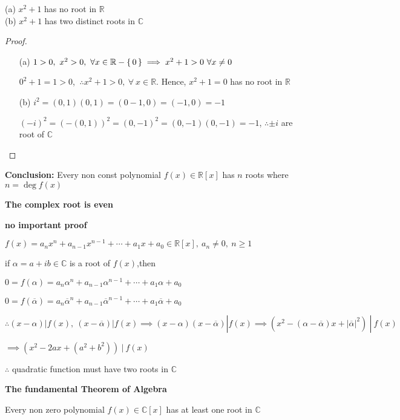 \begin{thm*}  $ $\\
		(a) $x^2 + 1$ has no root in $\mathbb R$\\
		(b) $x^2 + 1$ has two distinct roots in $\mathbb C$
\end{thm*}

\begin{proof}$ $
	\begin{enumerate}
		\item[(a)] $1>0,~x^2>0,~\forall x \in \mathbb R - \left\{ \,0 \,\right\} \implies x^2 + 1 > 0 ~\forall x \neq 0$ 
		
		$0^2 + 1 = 1 > 0$, $~\therefore x^2 + 1 > 0 ,~\forall~ x \in \mathbb R$. Hence, $x^2 + 1 = 0$ has no root in $\mathbb R$
		\item[(b)] $i^2 = (0,1)(0,1) = (0-1,0) = (-1,0) = -1$
		
		$(-i)^2 = (-(0,1))^2 = (0,-1)^2 = (0,-1)(0,-1) = -1$, $\therefore \pm i$ are root of $\mathbb C$
	\end{enumerate}
\end{proof}

\textbf{Conclusion:} Every non const polynomial $f(x) \in \mathbb R[x]$ has $n$ roots where $n = \deg f(x)$


\textbf{The complex root is even}
\begin{tcolorbox}
	\textbf{\color{blue} no important proof} 
	
	$f(x) = a_nx^n + a_{n-1}x^{n-1}+\cdots+a_1x+a_0 \in \mathbb R[x],~a_n \neq 0,~n\geq 1$
	
	if $\alpha = a+ib \in \mathbb C$ is a root of $f(x)$,then
	
	$0 = f(\alpha) = a_n\alpha^n + a_{n-1}\alpha^{n-1}+\cdots + a_1\alpha + a_0$
	
	$0 = f(\overline{\alpha}) = a_n\overline{\alpha}^n + a_{n-1}\overline{\alpha}^{n-1}+\cdots+a_1\overline{\alpha} + a_0$
	
	$\therefore (x - \alpha)|f(x),~(x-\overline{\alpha})|f(x) \implies (x-\alpha)(x-\overline{\alpha})|f(x) \implies (x^2 - (\alpha - \overline{\alpha})x + |\overline{\alpha}|^2)~|~f(x)$
	
	$\implies (x^2 - 2ax +(a^2+b^2))~|~f(x)$
	
	$\therefore$ quadratic function must have two roots in $\mathbb C$
\end{tcolorbox}

\textbf{The fundamental Theorem of Algebra}

Every non zero polynomial $f(x) \in \mathbb C[x]$ has at least one root in $\mathbb C$


